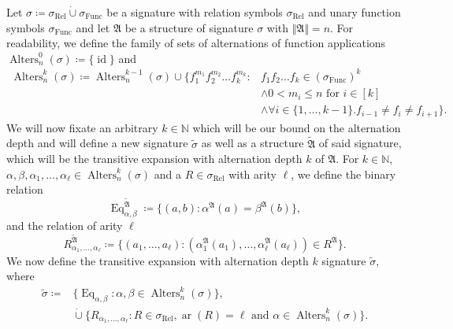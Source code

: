 \begin{definition}
	Let $\sigma\coloneqq \sigma_{\operatorname{Rel}} \operatorname{\dot{\cup}} \sigma_{\operatorname{Func}}$ be a signature with relation symbols $\sigma_{\operatorname{Rel}}$ and unary function symbols $\sigma_{\operatorname{Func}}$ and let $\mathfrak A$ be a structure of signature $\sigma$ with $\Vert \mathfrak A \Vert=n$.
	For readability, we define the family of sets of alternations of function applications $\operatorname{Alters}_n^0(\sigma)\coloneqq\{\operatorname{id}\}$ and
	\begin{align*}
		\operatorname{Alters}^k_{n}(\sigma)\coloneqq \operatorname{Alters}^{k-1}_{n}(\sigma)\cup\{f_1^{m_1}f_2^{m_2}\dots f_k^{m_k} : & f_1f_2\dots f_k\in (\sigma_{\operatorname{Func}})^k \\ 
		& \land 0 < m_i \leq n \text{ for } i \in [k] \\ 
		& \land \forall i\in\{1,\dots,k-1\} . f_{i-1}\neq f_i \neq f_{i+1}\}.
	\end{align*}
	We will now fixate an arbitrary $k\in\mathbb N$ which will be our bound on the alternation depth and will define a new signature $\widetilde{\sigma}$ as well as a structure $\widetilde{\mathfrak A}$ of said signature, which will be the transitive expansion with alternation depth $k$ of $\mathfrak{A}$.
	For $k\in\mathbb N$, $\alpha,\beta,\alpha_1,\dots,\alpha_\ell\in \operatorname{Alters}^k_n(\sigma)$ and a $R\in \sigma_{\operatorname{Rel}}$ with arity $\ell$, we define the binary relation
	$$\operatorname{Eq}_{\alpha,\beta}^{\widetilde{\mathfrak A}}\coloneqq \{(a,b) : \alpha^{\mathfrak A}(a)=\beta^{\mathfrak A}(b)\},$$
	and the relation of arity $\ell$
	$$R_{\alpha_1,\dots,\alpha_\ell}^{\widetilde{\mathfrak A}} \coloneqq \{(a_1,\dots,a_\ell) : (\alpha_1^{\mathfrak A}(a_1),\dots,\alpha_\ell^{\mathfrak A}(a_\ell))\in R^{\mathfrak A}\}.$$
	We now define the transitive expansion with alternation depth $k$ signature $\widetilde{\sigma}$, where 
	\begin{align*}
		\widetilde{\sigma}\coloneqq & \{\operatorname{Eq}_{\alpha,\beta}: \alpha,\beta\in\operatorname{Alters}^k_n(\sigma)\}, \\
		& \operatorname{\dot{\cup}} \{R_{\alpha_1,\dots,\alpha_\ell} : R\in \sigma_{\operatorname{Rel}},\operatorname{ar}(R)=\ell \text{ and } \alpha\in \operatorname{Alters}^k_n(\sigma)\}.
	\end{align*}
\end{definition}

